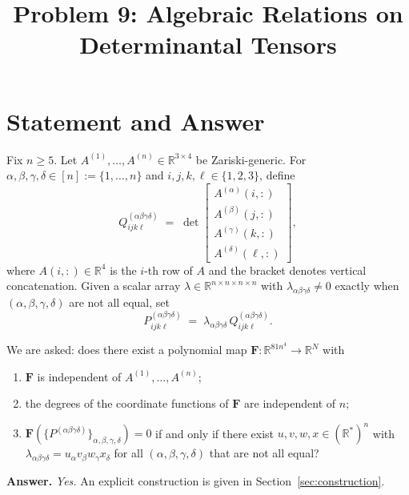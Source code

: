 \documentclass[12pt]{article}
\title{Problem 9: Algebraic Relations on Determinantal Tensors}
\author{}
\date{}
\theoremstyle{definition}
\begin{document}
\maketitle

\section{Statement and Answer}

Fix $n\geq 5$. Let $A^{(1)},\ldots,A^{(n)}\in\mathbb{R}^{3\times 4}$ be Zariski-generic. For
$\alpha,\beta,\gamma,\delta\in[n]:=\{1,\ldots,n\}$ and $i,j,k,\ell\in\{1,2,3\}$, define
\begin{equation}\label{eq:Q-def}
Q^{(\alpha\beta\gamma\delta)}_{ijk\ell}\;=\;
\det\!\begin{bmatrix}
A^{(\alpha)}(i,:)\\
A^{(\beta)}(j,:)\\
A^{(\gamma)}(k,:)\\
A^{(\delta)}(\ell,:)
\end{bmatrix},
\end{equation}
where $A(i,:)\in\mathbb{R}^4$ is the $i$-th row of $A$ and the bracket denotes vertical
concatenation. Given a scalar array $\lambda\in\mathbb{R}^{n\times n\times n\times n}$ with
$\lambda_{\alpha\beta\gamma\delta}\neq 0$ exactly when $(\alpha,\beta,\gamma,\delta)$ are not
all equal, set
\begin{equation}\label{eq:Pdef}
P^{(\alpha\beta\gamma\delta)}_{ijk\ell}\;=\;\lambda_{\alpha\beta\gamma\delta}\,
Q^{(\alpha\beta\gamma\delta)}_{ijk\ell}.
\end{equation}

We are asked: does there exist a polynomial map
$\mathbf{F}:\mathbb{R}^{81n^4}\to\mathbb{R}^N$ with
\begin{enumerate}
\item[(P1)] $\mathbf{F}$ is independent of $A^{(1)},\ldots,A^{(n)}$;
\item[(P2)] the degrees of the coordinate functions of $\mathbf{F}$ are independent of $n$;
\item[(P3)] $\mathbf{F}\!\left(\{P^{(\alpha\beta\gamma\delta)}\}_{\alpha,\beta,\gamma,\delta}\right)=0$
if and only if there exist $u,v,w,x\in(\mathbb{R}^*)^n$ with
$\lambda_{\alpha\beta\gamma\delta}=u_\alpha v_\beta w_\gamma x_\delta$ for all
$(\alpha,\beta,\gamma,\delta)$ that are not all equal?
\end{enumerate}

\textbf{Answer.} \emph{Yes.} An explicit construction is given in Section~\ref{sec:construction}.
\end{document}
